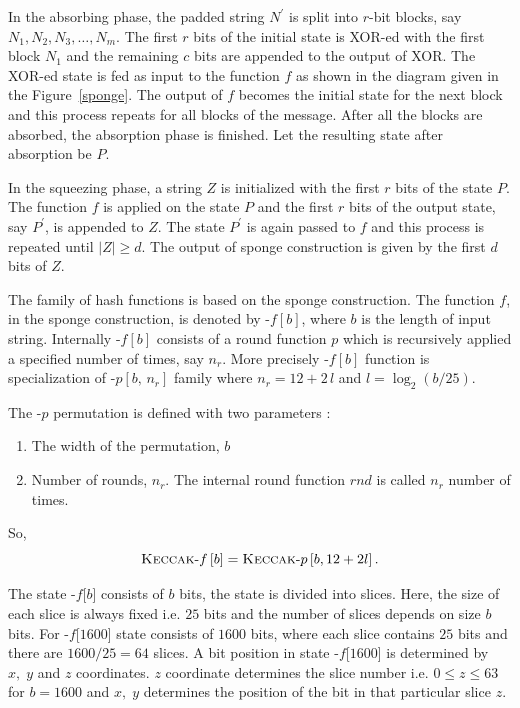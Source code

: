 In the absorbing phase, the padded string $N^\prime$ is split into $r$-bit blocks, say $N_1, N_2, N_3,\ldots,N_m$. The first $r$ bits of the initial state is XOR-ed with the first block $N_1$ and the remaining $c$ bits are appended to the output of XOR. The XOR-ed state is fed as input to the function $f$ as shown in the diagram given in the Figure~\ref{sponge}. The output of $f$ becomes the initial state for the next block and this process repeats for all blocks of the message. After all the blocks are absorbed, the absorption phase is finished. Let the resulting state after absorption be $P$. 

In the squeezing phase, a string $Z$ is initialized with the first $r$ bits of the state $P$. The function $f$ is applied on the state $P$ and the first $r$ bits of the output state, say $P^\prime$, is appended to $Z$. The state $P^\prime$ is again passed to $f$ and this process is repeated until $|Z| \geq d$. The output of sponge construction is given by the first $d$ bits of $Z$.

The \Keccak{} family of hash functions is based on the sponge construction. The function $f$, in the sponge construction, is denoted by \Keccak-$f\left[b\right]$, where $b$ is the length of input string. Internally \Keccak-$f\left[b\right]$ consists of a round function $p$ which is recursively applied a specified number of times, say $n_r$. More precisely \Keccak-$f\left[b\right]$ function is specialization of \Keccak-$p\left[b,\,n_r\right]$ family where $n_r = 12 + 2\,l$ and $l = \log_2 (b/25)$.

The \KECCAK-$p$ permutation is defined with two parameters :
\begin{enumerate}
    \item The width of the permutation, $b$
    \item Number of rounds, $n_r$. The internal round function $rnd$ is called $n_r$ number of times.
\end{enumerate}

So,
\[
    \mbox{\textsc{Keccak}}\text{-}f\left[b\right] = \mbox{\textsc{Keccak}}\text{-}p\left[b,  12 + 2l\right].
\]

The state \KECCAK-$f$[$b$] consists of $b$ bits, the state is divided into slices. Here, the size of each slice is always fixed i.e. $25$ bits and the number of slices depends on size $b$ bits. For \KECCAK-$f$[$1600$] state consists of $1600$ bits, where each slice contains $25$ bits and there are $1600/25 = 64$ slices. A bit position in state \KECCAK-$f$[$1600$] is determined by $x,\;y$ and $z$ coordinates. $z$ coordinate determines the slice number i.e. $0 \leq z \leq 63$ for $b = 1600$ and $x,\;y$ determines the position of the bit in that particular slice $z$.

